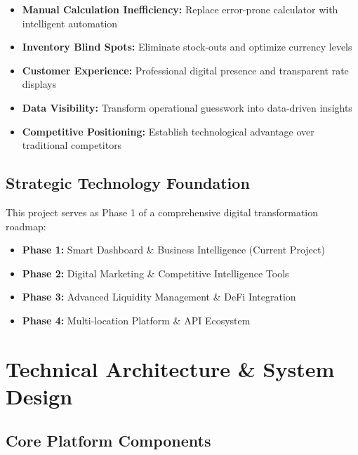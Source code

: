 \documentclass[11pt, letterpaper]{article}
\begin{document}
\begin{tcolorbox}[colback=accentBlue!10, colframe=accentBlue, title=\textbf{Immediate Pain Points Addressed}]
\begin{itemize}[leftmargin=*]
    \item \textbf{Manual Calculation Inefficiency:} Replace error-prone calculator with intelligent automation
    \item \textbf{Inventory Blind Spots:} Eliminate stock-outs and optimize currency levels
    \item \textbf{Customer Experience:} Professional digital presence and transparent rate displays
    \item \textbf{Data Visibility:} Transform operational guesswork into data-driven insights
    \item \textbf{Competitive Positioning:} Establish technological advantage over traditional competitors
\end{itemize}
\end{tcolorbox}

\subsection{Strategic Technology Foundation}

This project serves as Phase 1 of a comprehensive digital transformation roadmap:

\begin{itemize}[leftmargin=*]
    \item \textbf{Phase 1:} Smart Dashboard \& Business Intelligence (Current Project)
    \item \textbf{Phase 2:} Digital Marketing \& Competitive Intelligence Tools
    \item \textbf{Phase 3:} Advanced Liquidity Management \& DeFi Integration
    \item \textbf{Phase 4:} Multi-location Platform \& API Ecosystem
\end{itemize}

\section{Technical Architecture \& System Design}

\subsection{Core Platform Components}
\end{document}
